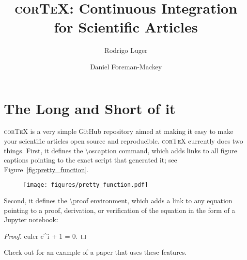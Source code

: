 \documentclass[modern]{aastex62}
\begin{document}
\title{\textsc{corTeX}: Continuous Integration for Scientific Articles}

\author[0000-0002-0296-3826]{Rodrigo Luger}
%
\author[0000-0002-9328-5652]{Daniel Foreman-Mackey}

\section*{The Long and Short of it}
\label{sec:intro}
%
\textsc{corTeX} is a very simple \textsf{GitHub} repository aimed at making
it easy to make your scientific articles open source and reproducible.
\textsc{corTeX} currently does two things. First, it defines the
\textsf{\textbackslash oscaption} command, which adds
links to all figure captions pointing to the exact script that generated it;
see Figure~\ref{fig:pretty_function}.
%
\begin{figure}[h!]
    \begin{centering}
    \texttt{[image: figures/pretty\_function.pdf]}
    \end{centering}
\end{figure}
%

Second, it defines the \textsf{\textbackslash proof} environment, which
adds a link to any equation pointing to a proof, derivation, or
verification of the equation in the form of a \textsf{Jupyter} notebook:
%
\begin{proof}{euler}
    \label{eq:euler}
    e^{i\pi} + 1 = 0.
\end{proof}
%
Check out \citet{Luger2018} for an example of a paper that uses these
features.

\pagebreak

\end{document}
